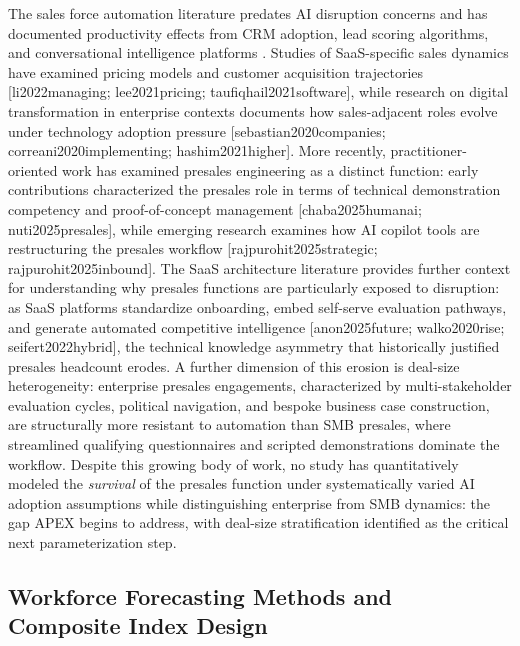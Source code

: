 \documentclass[10pt, conference]{IEEEtran}
\begin{document}
\label{sec:saas_sales_presales_labor_and_the_b2b_te}

The sales force automation literature predates AI disruption concerns and has documented productivity effects from CRM adoption, lead scoring algorithms, and conversational intelligence platforms \cite{groene2024introduction}. Studies of SaaS-specific sales dynamics have examined pricing models and customer acquisition trajectories [li2022managing; lee2021pricing; taufiqhail2021software], while research on digital transformation in enterprise contexts documents how sales-adjacent roles evolve under technology adoption pressure [sebastian2020companies; correani2020implementing; hashim2021higher]. More recently, practitioner-oriented work has examined presales engineering as a distinct function: early contributions characterized the presales role in terms of technical demonstration competency and proof-of-concept management [chaba2025humanai; nuti2025presales], while emerging research examines how AI copilot tools are restructuring the presales workflow [rajpurohit2025strategic; rajpurohit2025inbound]. The SaaS architecture literature provides further context for understanding why presales functions are particularly exposed to disruption: as SaaS platforms standardize onboarding, embed self-serve evaluation pathways, and generate automated competitive intelligence [anon2025future; walko2020rise; seifert2022hybrid], the technical knowledge asymmetry that historically justified presales headcount erodes. A further dimension of this erosion is deal-size heterogeneity: enterprise presales engagements, characterized by multi-stakeholder evaluation cycles, political navigation, and bespoke business case construction, are structurally more resistant to automation than SMB presales, where streamlined qualifying questionnaires and scripted demonstrations dominate the workflow. Despite this growing body of work, no study has quantitatively modeled the \textit{survival} of the presales function under systematically varied AI adoption assumptions while distinguishing enterprise from SMB dynamics: the gap APEX begins to address, with deal-size stratification identified as the critical next parameterization step.

\subsection{Workforce Forecasting Methods and Composite Index Design}

\label{sec:workforce_forecasting_methods_and_compos}
\end{document}
